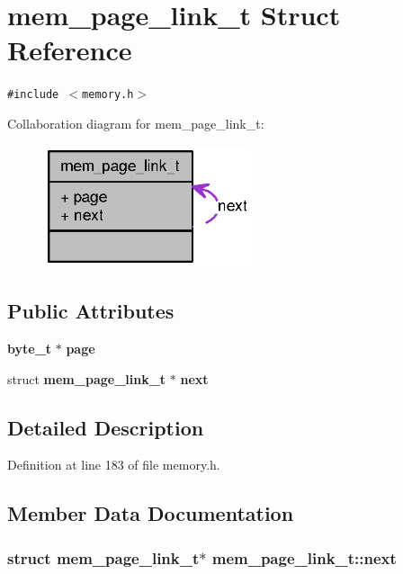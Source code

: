 \section{mem\_\-page\_\-link\_\-t Struct Reference}
\label{structmem__page__link__t}
{\tt \#include $<$memory.h$>$}

Collaboration diagram for mem\_\-page\_\-link\_\-t:\nopagebreak
\begin{figure}[H]
\begin{center}
\leavevmode
\includegraphics[width=173pt]{structmem__page__link__t__coll__graph}
\end{center}
\end{figure}
\subsection*{Public Attributes}
\begin{CompactItemize}
\item 
{\bf byte\_\-t} $\ast$ {\bf page}
\item 
struct {\bf mem\_\-page\_\-link\_\-t} $\ast$ {\bf next}
\end{CompactItemize}


\subsection{Detailed Description}


Definition at line 183 of file memory.h.

\subsection{Member Data Documentation}
\subsubsection[{next}]{\setlength{\rightskip}{0pt plus 5cm}struct {\bf mem\_\-page\_\-link\_\-t}$\ast$ {\bf mem\_\-page\_\-link\_\-t::next}\hspace{0.3cm}{\tt  [read]}}\label{structmem__page__link__t_90f8b687a3abdd4d935b2de689951b4d}




